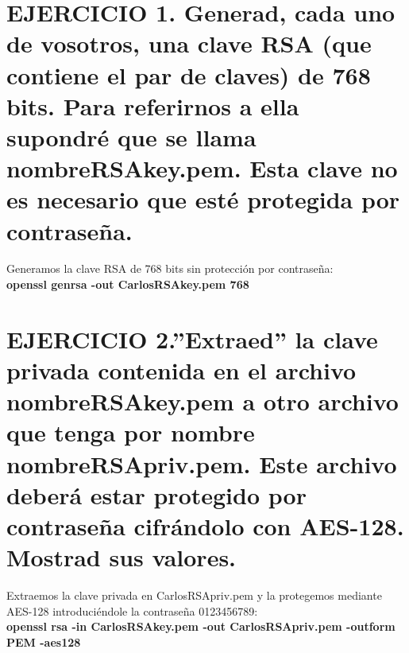 

\section{EJERCICIO 1. Generad, cada uno de vosotros, una clave RSA (que contiene el par de claves) de 768 bits. Para referirnos a ella supondré que se llama nombreRSAkey.pem. Esta clave no es necesario que esté protegida por contraseña.}

Generamos la clave RSA de 768 bits sin protección por contraseña: \\
\textbf{openssl genrsa -out CarlosRSAkey.pem 768}








\section{EJERCICIO 2.''Extraed'' la clave privada contenida en el archivo nombreRSAkey.pem a otro archivo que tenga por nombre nombreRSApriv.pem. Este archivo deberá estar protegido por contraseña cifrándolo con AES-128. Mostrad sus valores.}

Extraemos la clave privada en CarlosRSApriv.pem y la protegemos mediante AES-128 introduciéndole la contraseña 0123456789: \\
\textbf{openssl rsa -in CarlosRSAkey.pem -out CarlosRSApriv.pem -outform PEM -aes128}

